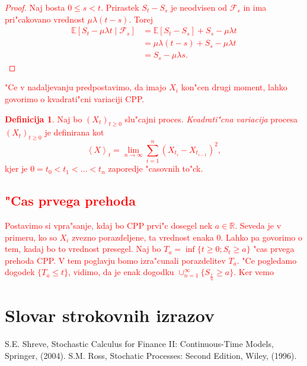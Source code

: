 \documentclass[12pt,a4paper]{amsart}
\theoremstyle{definition} %
\newtheorem{definicija}{Definicija}[section]
\theoremstyle{plain} %
\newcommand{\geslo}[2]{\noindent\textbf{#1}\hspace*{3mm}\hangindent=\parindent\hangafter=1 #2}
\newcommand{\R}{\mathbb{R}}
\newcommand{\E}{\mathbb{E}}
\newcommand{\F}{\mathcal{F}}
\newcommand{\1}{\mathds{1}}
\begin{document}
\textcolor{red}{
        \begin{proof}
            Naj bosta $0 \leq s < t$. Prirastek $S_t - S_s$ je neodvisen od $\F_s$ in ima 
            pri"cakovano vrednost $\mu\lambda(t-s)$. Torej 
            \begin{align*}
                \E\left[S_t - \mu\lambda t\mid\F_s\right] 
                        &= \E\left[S_t - S_s\right] + S_s - \mu\lambda t\\
                        &= \mu\lambda(t-s) + S_s - \mu\lambda t\\
                        &= S_s - \mu\lambda s.
            \end{align*}
        \end{proof}
}
\textcolor{red}{
        "Ce v nadaljevanju predpostavimo, da imajo $X_i$ kon"cen drugi moment, lahko govorimo o 
        kvadrati"cni variaciji CPP.
}
\textcolor{red}{
        \begin{definicija}
            Naj bo $(X_t)_{t\geq0}$ slu"cajni proces. \textit{Kvadrati"cna variacija} procesa 
            $(X_t)_{t\geq0}$ je definirana kot 
            $$
                \left<X\right>_t = \lim_{n\to\infty}\sum_{i=1}^{n}\left(X_{t_i} - X_{t_{i-1}}\right)^2,
            $$
            kjer je $0 = t_0 < t_1 < \ldots < t_n$ zaporedje "casovnih to"ck.
            \label{def:kvadrVariacija}
        \end{definicija}
}
\textcolor{red}{
        \subsection{"Cas prvega prehoda}
        Postavimo si vpra"sanje, kdaj bo CPP prvi"c dosegel nek $a\in\R$. Seveda je v primeru, ko
        so $X_i$ zvezno porazdeljene, ta vrednost enaka $0$. Lahko pa govorimo o tem, kadaj bo to
        vrednost presegel. Naj bo $T_a = \inf\{t\geq0; S_t \geq a\}$ "cas prvega prehoda CPP. 
        V tem poglavju bomo izra"cunali porazdelitev $T_a$.
        "Ce pogledamo dogodek $\{T_a \leq t\}$, vidimo, da je enak dogodku 
        $\cup_{n = 1}^\infty\{S_{\tfrac{t}{n}} \geq a\}$. Ker vemo 
}














\section*{Slovar strokovnih izrazov}

%
%


\begin{thebibliography}{99}

S.E. Shreve, Stochastic Calculus for Finance II: Continuous-Time Models, Springer, (2004).
S.M. Ross, Stochatic Processes: Second Edition, Wiley, (1996).
\end{thebibliography}
\end{document}
